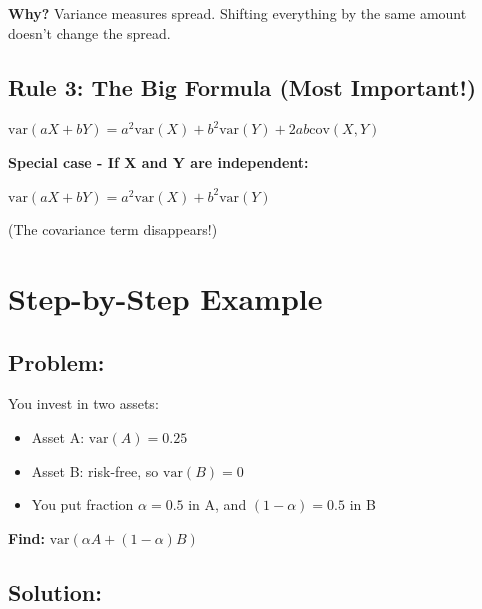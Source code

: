 \documentclass[12pt]{article}
\begin{document}
\vspace{1em}

\textbf{Why?} Variance measures spread. Shifting everything by the same amount doesn't change the spread.

\newpage

\subsection*{\large Rule 3: The Big Formula (Most Important!)}

\begin{center}
\colorbox{red!20}{
\LARGE
$\text{var}(aX + bY) = a^2\text{var}(X) + b^2\text{var}(Y) + 2ab\text{cov}(X,Y)$
}
\end{center}

\vspace{1em}

\textbf{Special case - If X and Y are independent:}

\begin{center}
\colorbox{green!20}{
\LARGE
$\text{var}(aX + bY) = a^2\text{var}(X) + b^2\text{var}(Y)$
}
\end{center}

(The covariance term disappears!)

\vspace{2em}

\section*{\Large Step-by-Step Example}

\subsection*{Problem:}

You invest in two assets:
\begin{itemize}[leftmargin=2cm]
    \item Asset A: $\text{var}(A) = 0.25$
    \item Asset B: risk-free, so $\text{var}(B) = 0$
    \item You put fraction $\alpha = 0.5$ in A, and $(1-\alpha) = 0.5$ in B
\end{itemize}

\textbf{Find:} $\text{var}(\alpha A + (1-\alpha)B)$

\vspace{1em}

\subsection*{Solution:}
\end{document}
